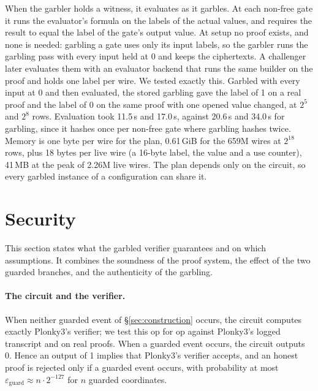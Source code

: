 \documentclass[11pt]{article}
\begin{document}
When the garbler holds a witness, it evaluates as it garbles. At each non-free
gate it runs the evaluator's formula on the labels of the actual values, and
requires the result to equal the label of the gate's output value. At setup no
proof exists, and none is needed: garbling a gate uses only its input labels,
so the garbler runs the garbling pass with every input held at 0 and keeps the
ciphertexts. A challenger later evaluates them with an evaluator backend that runs
the same builder on the proof and holds one label per wire. We tested exactly
this. Garbled with every input at 0 and then evaluated, the stored garbling gave
the label of 1 on a real proof and the label of 0 on the same proof with one
opened value changed, at $2^5$ and $2^8$ rows. Evaluation took 11.5\,s and
17.0\,s, against 20.6\,s and 34.0\,s for garbling, since it hashes once per
non-free gate where garbling hashes twice. Memory is one byte per wire for the plan, 0.61\,GiB for the 659M wires at
$2^{18}$ rows, plus 18 bytes per live wire (a 16-byte label, the value and a use
counter), 41\,MB at the peak of 2.26M live wires. The plan depends only on the circuit, so every garbled
instance of a configuration can share it.

\section{Security}\label{sec:security}

This section states what the garbled verifier guarantees and on which
assumptions. It combines the soundness of the proof system, the effect of the two
guarded branches, and the authenticity of the garbling.

\paragraph{The circuit and the verifier.} When neither guarded event of
\S\ref{sec:construction} occurs, the circuit computes exactly Plonky3's verifier;
we test this op for op against Plonky3's logged transcript and on real proofs.
When a guarded event occurs, the circuit outputs 0. Hence an output of 1 implies
that Plonky3's verifier accepts, and an honest proof is rejected only if a guarded
event occurs, with probability at most $\varepsilon_{\mathrm{guard}}\approx
n\cdot2^{-127}$ for $n$ guarded coordinates.
\end{document}
